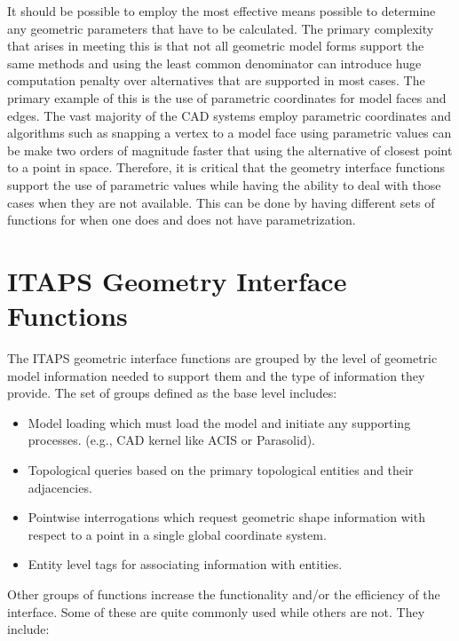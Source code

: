 \documentclass{article}
\begin{document}
It should be possible to employ the most effective means 
possible to determine any geometric parameters that have to be 
calculated. The primary complexity that arises in meeting this 
is that not all geometric model forms support the same methods 
and using the least common denominator can introduce huge computation 
penalty over alternatives that are supported in most cases. The 
primary example of this is the use of parametric coordinates 
for model faces and edges. The vast majority of the CAD systems 
employ parametric coordinates and algorithms such as snapping 
a vertex to a model face using parametric values can be make 
two orders of magnitude faster that using the alternative of 
closest point to a point in space. Therefore, it is critical 
that the geometry interface functions support the use of parametric 
values while having the ability to deal with those cases when 
they are not available. This can be done by having different 
sets of functions for when one does and does not have parametrization.


\section{ITAPS Geometry Interface Functions}

The ITAPS geometric interface functions are grouped by the 
level of geometric model information needed to support them and 
the type of information they provide. The set of groups defined 
as the base level includes:

\begin{itemize}

\item Model loading which must load the model and initiate 
any supporting processes. (e.g., CAD kernel like ACIS or Parasolid).
\item Topological queries based on the primary topological 
entities and their adjacencies.
\item Pointwise interrogations which request geometric 
shape information with respect to a point in a single global 
coordinate system. 
\item Entity level tags for associating information 
with entities. 
\end{itemize}

Other groups of functions increase the functionality and/or 
the efficiency of the interface. Some of these are quite commonly 
used while others are not. They include:
\end{document}
